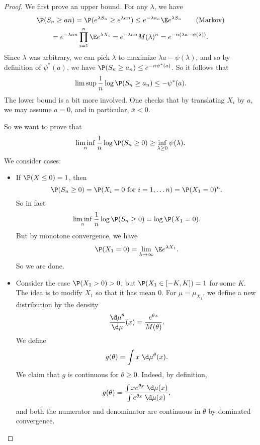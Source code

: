 \documentclass[a4paper]{article}
\begin{document}
\begin{proof}
  We first prove an upper bound. For any $\lambda$, we have
  \begin{multline*}
    \P(S_n \geq an) = \P(e^{\lambda S_n} \geq e ^{\lambda an}) \leq e^{-\lambda a_n} \E e^{\lambda S_n} \tag{Markov}\\
    = e^{-\lambda an} \prod_{i = 1}^n \E e^{\lambda X_i} = e^{-\lambda a n} M(\lambda)^n = e^{-n (\lambda a - \psi(\lambda))}.
  \end{multline*}
  Since $\lambda$ was arbitrary, we can pick $\lambda$ to maximize $\lambda a - \psi(\lambda)$, and so by definition of $\psi^*(a)$, we have $\P(S_n \geq a_n) \leq e^{-n \psi^*(a)}$. So it follows that
  \[
    \limsup \frac{1}{n} \log \P(S_n \geq a_n) \leq - \psi^*(a).
  \]
  The lower bound is a bit more involved. One checks that by translating $X_i$ by $a$, we may assume $a = 0$, and in particular, $\bar{x} < 0$.

  So we want to prove that
  \[
    \liminf_n \frac{1}{n} \log \P(S_n \geq 0) \geq \inf_{\lambda \geq 0} \psi(\lambda).
  \]
  We consider cases:
  \begin{itemize}
    \item If $\P(X \leq 0) = 1$, then
      \[
        \P(S_n \geq 0) = \P(X_i = 0\text{ for } i = 1, \ldots n) = \P(X_1 = 0)^n.
      \]
      So in fact
      \[
        \liminf_n \frac{1}{n} \log \P(S_n \geq 0) = \log \P(X_1 = 0).
      \]
      But by monotone convergence, we have
      \[
        \P(X_1 = 0) = \lim_{\lambda \to \infty} \E e^{\lambda X_1}.
      \]
      So we are done.
    \item Consider the case $\P(X_1 > 0) > 0$, but $\P(X_1 \in [-K, K]) = 1$ for some $K$. The idea is to modify $X_1$ so that it has mean $0$. For $\mu = \mu_{X_1}$, we define a new distribution by the density
      \[
        \frac{\d \mu^\theta}{\d \mu}(x) = \frac{e^{\theta x}}{M(\theta)}.
      \]
      We define
      \[
        g(\theta) = \int x\; \d \mu^\theta(x).
      \]
      We claim that $g$ is continuous for $\theta \geq 0$. Indeed, by definition,
      \[
        g(\theta) = \frac{\int x e^{\theta x}\;\d \mu(x)}{ \int e^{\theta x}\;\d \mu(x)},
      \]
      and both the numerator and denominator are continuous in $\theta$ by dominated convergence.


\end{itemize}
\end{proof}
\end{document}
